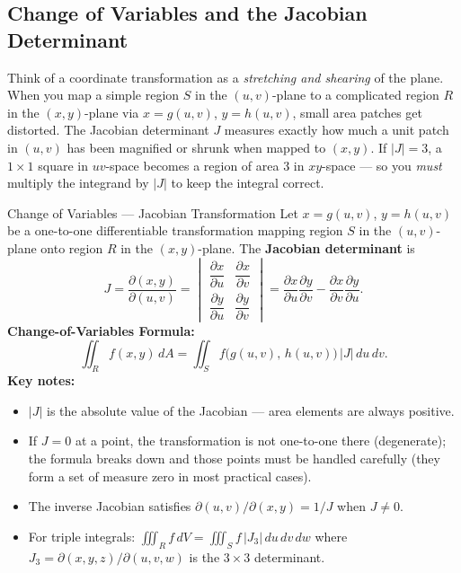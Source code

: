 \documentclass[12pt,a4paper]{article}
\begin{document}
\subsection{Change of Variables and the Jacobian Determinant}

Think of a coordinate transformation as a \emph{stretching and shearing} of the plane. When you map
a simple region $S$ in the $(u,v)$-plane to a complicated region $R$ in the $(x,y)$-plane via
$x = g(u,v)$, $y = h(u,v)$, small area patches get distorted. The Jacobian determinant $J$ measures
exactly how much a unit patch in $(u,v)$ has been magnified or shrunk when mapped to $(x,y)$. If
$|J| = 3$, a $1 \times 1$ square in $uv$-space becomes a region of area 3 in $xy$-space --- so you
\emph{must} multiply the integrand by $|J|$ to keep the integral correct.

\begin{infobox}{Change of Variables --- Jacobian Transformation}
Let $x = g(u,v)$, $y = h(u,v)$ be a one-to-one differentiable transformation mapping region $S$ in
the $(u,v)$-plane onto region $R$ in the $(x,y)$-plane. The \textbf{Jacobian determinant} is
\[
  J = \frac{\partial(x,y)}{\partial(u,v)}
    = \begin{vmatrix} \dfrac{\partial x}{\partial u} & \dfrac{\partial x}{\partial v} \\[8pt]
                      \dfrac{\partial y}{\partial u} & \dfrac{\partial y}{\partial v} \end{vmatrix}
    = \frac{\partial x}{\partial u}\frac{\partial y}{\partial v}
      - \frac{\partial x}{\partial v}\frac{\partial y}{\partial u}.
\]
\textbf{Change-of-Variables Formula:}
\[
  \iint_R f(x,y)\,dA = \iint_S f\bigl(g(u,v),\,h(u,v)\bigr)\,\bigl|J\bigr|\,du\,dv.
\]
\textbf{Key notes:}
\begin{itemize}[leftmargin=1.5em]
  \item $|J|$ is the absolute value of the Jacobian --- area elements are always positive.
  \item If $J = 0$ at a point, the transformation is not one-to-one there (degenerate); the formula
        breaks down and those points must be handled carefully (they form a set of measure zero in
        most practical cases).
  \item The inverse Jacobian satisfies $\partial(u,v)/\partial(x,y) = 1/J$ when $J \neq 0$.
  \item For triple integrals: $\iiint_R f\,dV = \iiint_S f\,|J_3|\,du\,dv\,dw$ where
        $J_3 = \partial(x,y,z)/\partial(u,v,w)$ is the $3\times3$ determinant.
\end{itemize}
\end{infobox}
\end{document}
